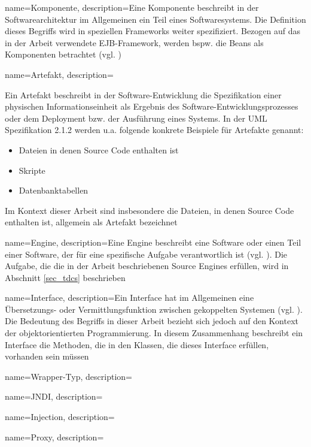 

{
    name=Komponente,
    description={Eine Komponente beschreibt in der Softwarearchitektur im Allgemeinen ein Teil eines Softwaresystems. Die Definition dieses Begriffs wird in speziellen Frameworks weiter spezifiziert. Bezogen auf das in der Arbeit verwendete EJB-Framework, werden bspw. die Beans als Komponenten betrachtet (vgl. \cite{ejbspec})}
}
{
    name=Artefakt,
    description={Ein Artefakt beschreibt in der Software-Entwicklung die Spezifikation einer physischen Informationseinheit als Ergebnis des Software-Entwicklungsprozesses oder dem Deployment bzw. der Ausführung eines Systems. In der UML Spezifikation 2.1.2 \cite{uml} werden u.a. folgende konkrete Beispiele für Artefakte genannt:
    \begin{itemize}
    \item Dateien in denen Source Code enthalten ist
    \item Skripte
    \item Datenbanktabellen    
    \end{itemize}
    \noindent
    Im Kontext dieser Arbeit sind insbesondere die Dateien, in denen Source Code enthalten ist, allgemein als Artefakt bezeichnet}
}


{
    name=Engine,
    description={Eine Engine beschreibt eine Software oder einen Teil einer Software, der für eine spezifische Aufgabe verantwortlich ist (vgl. \cite{pcmag}). Die Aufgabe, die die in der Arbeit beschriebenen Source Engines erfüllen, wird in Abschnitt \ref{sec_tdcs} beschrieben}
}


{
    name=Interface,
    description={Ein Interface hat im Allgemeinen eine Übersetzungs- oder Vermittlungsfunktion zwischen gekoppelten Systemen (vgl. \cite{interfaces}). Die Bedeutung des Begriffs in dieser Arbeit bezieht sich jedoch auf den Kontext der objektorientierten Programmierung. In diesem Zusammenhang beschreibt ein Interface die Methoden, die in den Klassen, die dieses Interface erfüllen, vorhanden sein müssen}
}


{
    name=Wrapper-Typ,
    description={}
}

{
    name=JNDI,
    description={}
}


{
    name=Injection,
    description={}
}


{
    name=Proxy,
    description={}
}